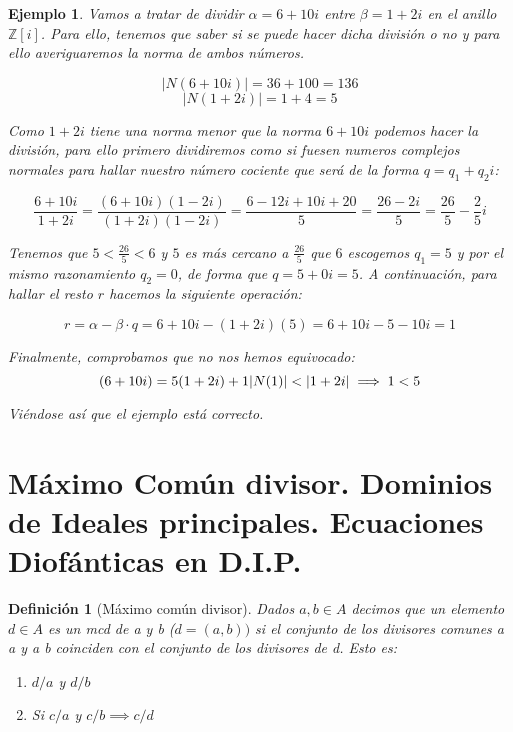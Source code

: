 \documentclass[11pt, a4paper, titlepage]{article}
\providecommand{\ent}{\mathbb{Z}}
\providecommand{\abs}[1]{\lvert#1\rvert}
\theoremstyle{theorem-style}
\theoremstyle{definition-style}
\newtheorem*{ndef}{Definición}
\theoremstyle{remark-style}
\theoremstyle{example-style}
\newtheorem*{ejemplo}{Ejemplo}
\newenvironment{nlist}
{\begin{enumerate}
\renewcommand\labelenumi{(\emph{\roman{enumi})}}}
{\end{enumerate}}
\begin{document}
\begin{ejemplo}
Vamos a tratar de dividir $\alpha=6+10i$ entre $\beta=1+2i$ en el anillo $\ent[i]$. Para ello, tenemos que saber si se puede hacer dicha división o no y para ello averiguaremos la norma de ambos números.

$$\abs{N(6+10i)}=36+100=136$$
$$\abs{N(1+2i)}=1+4=5$$

Como $1+2i$ tiene una norma menor que la norma $6+10i$ podemos hacer la división, para ello primero dividiremos como si fuesen numeros complejos normales para hallar nuestro número cociente que será de la forma $q=q_1+q_2i$:

\[
	\frac{6+10i}{1+2i}=\frac{(6+10i)(1-2i)}{(1+2i)(1-2i)}=\frac{6-12i+10i+20}{5}=\frac{26-2i}{5}=\frac{26}{5}-\frac{2}{5}i
\]

Tenemos que $5<\frac{26}{5}<6$ y $5$ es más cercano a $\frac{26}{5}$ que $6$ escogemos $q_1=5$ y por el mismo razonamiento $q_2=0$, de forma que $q=5+0i=5$. A continuación, para hallar el resto $r$ hacemos la siguiente operación:

\[
	r=\alpha-\beta \cdot q = 6+10i - (1+2i)(5)=6+10i-5-10i=1
\]

Finalmente, comprobamos que no nos hemos equivocado:
\[
	(6+10i)=5(1+2i)+1\\
	\abs{N(1)}<\abs{1+2i} \implies 1<5
\]

Viéndose así que el ejemplo está correcto.

\end{ejemplo}

\section{Máximo Común divisor. Dominios de Ideales principales. Ecuaciones Diofánticas en D.I.P.}


\begin{ndef}[Máximo común divisor]

Dados $a,b \in A$ decimos que un elemento $d\in A$ es un mcd de a y b ($d=(a,b))$ si el conjunto de los divisores comunes a a y a b coinciden con el conjunto de los divisores de d. Esto es:

\begin{nlist}
	\item $d/a$ y $d/b$
	\item Si $c/a$ y $c/b \implies c/d$ 
\end{nlist} 
	
\end{ndef}
\end{document}
